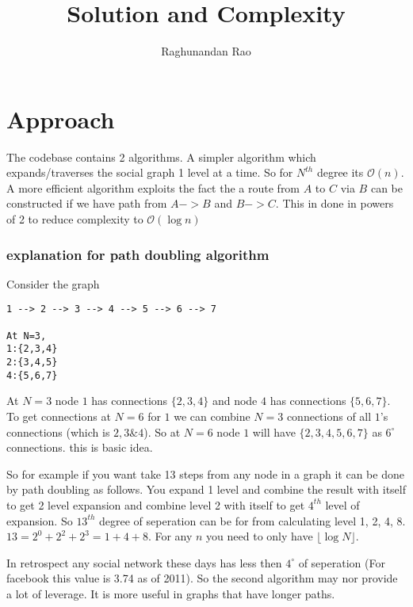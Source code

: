 \documentclass[a4paper]{article}
\begin{document}
 
\title{Solution and Complexity} 
\author{Raghunandan Rao}  %
\maketitle
 
\section{Approach}

The codebase contains 2 algorithms. A simpler algorithm which expands/traverses the social graph 1 level at a time. So for $N^{th}$ degree its $\mathcal{O}(n)$. A more efficient algorithm exploits the fact the a route from $A$ to $C$ via $B$ can be constructed if we have path from $A -> B$ and $B -> C$. This in done in powers of 2 to reduce complexity to $\mathcal{O}(\log n)$

\subsubsection{explanation for path doubling algorithm}
Consider the graph 
\begin{verbatim}
1 --> 2 --> 3 --> 4 --> 5 --> 6 --> 7

At N=3,
1:{2,3,4}
2:{3,4,5}
4:{5,6,7}
\end{verbatim}
 At $N=3$ node $1$ has connections $\{2, 3, 4\}$ and node $4$ has connections $\{5, 6, 7\}$. To get connections at $N=6$ for $1$ we can combine $N=3$ connections of all $1$'s connections (which is $2,3 \& 4$). So at $N=6$ node $1$ will have $\{2, 3, 4, 5, 6, 7\}$ as $6^\circ$ connections. this is basic idea.

So for example if you want take 13 steps from any node in a graph it can be done by path doubling as follows. You expand 1 level and combine the result with itself to get 2 level expansion and combine level 2 with itself to get $4^{th}$ level of expansion. So $13^{th}$ degree of seperation can be for from calculating level 1, 2, 4, 8. $ 13 = 2^0 + 2^2 + 2^3 = 1 + 4 + 8$. For any $n$ you need to only have $\lfloor \log N\rfloor$. 
  
In retrospect any social network these days has less then $4^\circ$ of seperation (For facebook this value is 3.74 as of 2011). So the second algorithm may nor provide a lot of leverage. It is more useful in graphs that have longer paths.     
\end{document}
